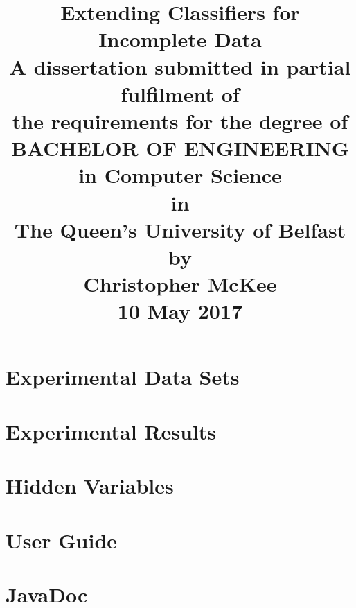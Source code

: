 \documentclass[12pt,a4paper]{report}
\begin{document}
\title{Extending Classifiers for Incomplete Data\\
\large
A dissertation submitted in partial fulfilment of\\
the requirements for the degree of\\
BACHELOR OF ENGINEERING in Computer Science\\
in\\
The Queen's University of Belfast\\
by\\
Christopher McKee\\
10 May 2017
}
\author{}
\date{}
\maketitle
\newpage



\tableofcontents
\listoftables
\listoffigures







\appendix
\chapter{Experimental Data Sets}
\label{datasets}

\chapter{Experimental Results}
\label{results}

\chapter{Hidden Variables}
\label{hidden}

\chapter{User Guide}
\label{uguide}

\chapter{JavaDoc}
\label{JavaDoc}

\end{document}
